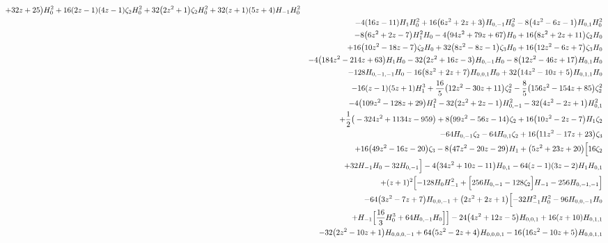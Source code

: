 \begin{eqnarray}
+32 z+25\big)H_0^2
+16 (2 z-1) (4 z-1) \zeta_2 H_0^2+32  \big(2 z^2+1\big)\zeta_2 H_0^2+32  (z+1) (5 z+4) H_{-1} H_0^2
\nonumber \\ &&
-4 (16 z-11) H_1H_0^2+16  \big(6 z^2+2 z+3\big) H_{0,-1} H_0^2-8 \big(4 z^2-6 z-1\big)H_{0,1} H_0^2
\nonumber \\ &&
-8 \big(6 z^2+2 z-7\big) H_1^2 H_0-4 \big(94 z^2+79 z+67\big)H_0+16  \big(8 z^2+2 z+11\big) \zeta_2 H_0
\nonumber \\ &&
+16 \big(10 z^2-18z-7\big) \zeta_2 H_0+32 \big(8 z^2-8 z-1\big) \zeta_3 H_0+16 \big(12 z^2-6 z+7\big) \zeta_3 H_0
\nonumber \\ &&
-4 \big(184 z^2-214 z+63\big) H_1H_0-32  \big(2 z^2+16 z-3\big) H_{0,-1} H_0-8 \big(12 z^2-46 z+17\big)H_{0,1} H_0
\nonumber \\ &&
-128  H_{0,-1,-1} H_0-16 \big(8 z^2+2 z+7\big) H_{0,0,1}H_0+32 \big(14 z^2-10 z+5\big) H_{0,1,1} H_0
\nonumber \\ &&
-16 (z-1) (5 z+1)H_1^3+\frac{16}{5}  \big(12 z^2-30 z+11\big) \zeta_2^2-\frac{8}{5}\big(156 z^2-154 z+85\big) \zeta_2^2
\nonumber \\ &&
-4 \big(109 z^2-128 z+29\big)H_1^2-32  \big(2 z^2+2 z-1\big) H_{0,-1}^2-32 \big(4 z^2-2 z+1\big)H_{0,1}^2
\nonumber \\ &&
+\frac{1}{2} \big(-324 z^2+1134 z-959\big)+8 \big(99 z^2-56 z-14\big)\zeta_2+16 \big(10 z^2-2 z-7\big) H_1 \zeta_2
\nonumber \\ &&
-64  H_{0,-1}\zeta_2-64 H_{0,1} \zeta_2+16  \big(11 z^2-17 z+23\big)\zeta_3
\nonumber \\ &&
+16 \big(49 z^2-16 z-20\big) \zeta_3-8 \big(47 z^2-20z-29\big) H_1+\big(5 z^2+23 z+20\big) \Bigl[16  \zeta_2
\nonumber \\ &&
+32 H_{-1} H_0-32  H_{0,-1}\Bigr]-4 \big(34 z^2+10 z-11\big) H_{0,1}-64 (z-1)(3 z-2) H_1 H_{0,1}
\nonumber \\ &&
+(z+1)^2 \Bigl[-128  H_0 H_{-1}^2+\Bigl[256 H_{0,-1}-128  \zeta_2\Bigr] H_{-1}-256  H_{0,-1,-1}\Bigr]
\nonumber \\ &&
-64 \big(3 z^2-7 z+7\big) H_{0,0,-1}+\big(2 z^2+2 z+1\big) \Bigl[-32 H_{-1}^2 H_0^2-96  H_{0,0,-1} H_0
\nonumber \\ &&
+H_{-1} \Bigl[\frac{16}{3} H_0^3+64  H_{0,-1} H_0\Bigr]\Bigr]-24 \big(4 z^2+12 z-5\big) H_{0,0,1}+16(z+10) H_{0,1,1}
\nonumber \\ &&
-32  \big(2 z^2-10 z+1\big) H_{0,0,0,-1}+64 \big(5 z^2-2z+4\big) H_{0,0,0,1}-16 \big(16 z^2-10 z+5\big)H_{0,0,1,1}
\nonumber \\ &&

\end{eqnarray}
